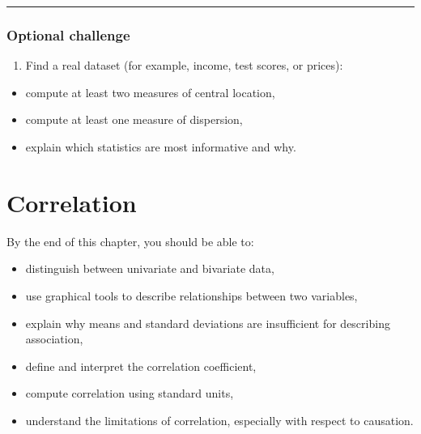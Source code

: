 \documentclass[
  letterpaper,
  DIV=11,
  numbers=noendperiod]{scrreprt}
\providecommand{\tightlist}{%
  \setlength{\itemsep}{0pt}\setlength{\parskip}{0pt}}
\begin{document}
\begin{center}\rule{0.5\linewidth}{0.5pt}\end{center}

\subsection{Optional challenge}\label{optional-challenge-1}

\begin{enumerate}
\def\labelenumi{\arabic{enumi}.}
\setcounter{enumi}{15}
\tightlist
\item
  Find a real dataset (for example, income, test scores, or prices):
\end{enumerate}

\begin{itemize}
\tightlist
\item
  compute at least two measures of central location,
\item
  compute at least one measure of dispersion,
\item
  explain which statistics are most informative and why.
\end{itemize}


\chapter{Correlation}\label{ch4}

\begin{tcolorbox}[enhanced jigsaw, coltitle=black, colbacktitle=quarto-callout-note-color!10!white, left=2mm, bottomrule=.15mm, bottomtitle=1mm, colback=white, titlerule=0mm, colframe=quarto-callout-note-color-frame, breakable, leftrule=.75mm, toptitle=1mm, opacitybacktitle=0.6, rightrule=.15mm, title=\textcolor{quarto-callout-note-color}{\faInfo}\hspace{0.5em}{Learning objectives}, arc=.35mm, opacityback=0, toprule=.15mm]

By the end of this chapter, you should be able to:

\begin{itemize}
\tightlist
\item
  distinguish between univariate and bivariate data,
\item
  use graphical tools to describe relationships between two variables,
\item
  explain why means and standard deviations are insufficient for
  describing association,
\item
  define and interpret the correlation coefficient,
\item
  compute correlation using standard units,
\item
  understand the limitations of correlation, especially with respect to
  causation.
\end{itemize}

\end{tcolorbox}
\end{document}
